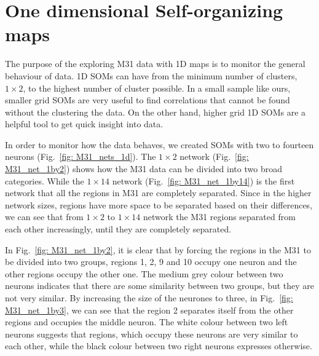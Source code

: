 \section{One dimensional Self-organizing maps}
    \label{Sec: 1d_cluster}
    The purpose of the exploring M31 data with 1D maps is to monitor the general behaviour of data. 
    1D SOMs can have from the minimum number of clusters, $1\times2$, to the highest number of cluster possible.
    In a small sample like ours, smaller grid SOMs are very useful to find correlations that cannot be found without the clustering the data.
    On the other hand, higher grid 1D SOMs are a helpful tool to get quick insight into data.

        In order to monitor how the data behaves, we created SOMs with two to fourteen neurons (Fig.~\ref{fig: M31_nets_1d}).
        The $1\times2$ network (Fig.~\ref{fig: M31_net_1by2}) shows how the M31 data can be divided into two broad categories.
        While the $1\times14$ network (Fig.~\ref{fig: M31_net_1by14}) is the first network that all the regions in M31 are completely separated.
        Since in the higher network sizes, regions have more space to be separated based on their differences, we can see that from $1\times2$ to $1\times14$ network the M31 regions separated from each other increasingly, until they are completely separated. 
        
        In Fig.~\ref{fig: M31_net_1by2}, it is clear that by forcing the regions in the M31 to be divided into two groups, regions 1, 2, 9 and 10 occupy one neuron and the other regions occupy the other one.
        The medium grey colour between two neurons indicates that there are some similarity between two groups, but they are not very similar. 
        By increasing the size of the neurones to three, in Fig.~\ref{fig: M31_net_1by3}, we can see that the region 2 separates itself from the other regions and occupies the middle neuron.
        The white colour between two left neurons suggests that regions, which occupy these neurons are very similar to each other, while the black colour between two right neurons expresses otherwise.
        
